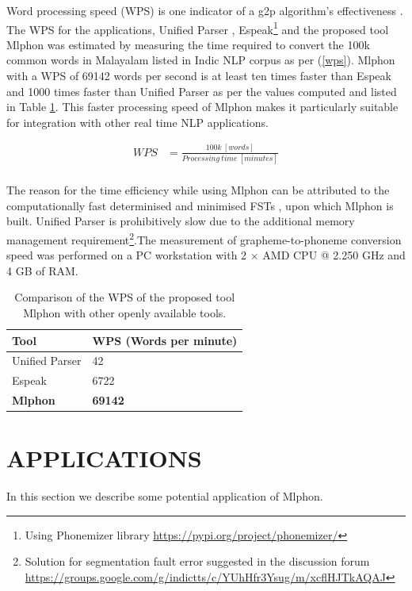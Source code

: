 \documentclass{ieeeaccess}
\begin{document}
Word processing speed (WPS) is one indicator of a g2p algorithm's effectiveness \cite{mdpi2022ruleg2p}. The WPS  for the applications, Unified Parser \cite{baby2016unified}, Espeak\footnote{Using Phonemizer library \url{https://pypi.org/project/phonemizer/}} and the proposed tool Mlphon was estimated by measuring the time required to convert the 100k common words in Malayalam listed in Indic NLP corpus \cite{kunchukuttan2020ai4bharat} as per (\ref{wps}). Mlphon with a WPS of 69142 words per second is at least ten times faster than Espeak and 1000 times faster than Unified Parser as per the values computed and listed in Table \ref{speed}. This faster processing speed of  Mlphon makes it particularly suitable for integration with other real time NLP applications.

\begin{equation}
\label{wps}
\begin{split}
WPS & =\frac{100k\ [words]}{Processing\ time\ [minutes]}  \\ 
\end{split}
\end{equation}

 The reason for the time efficiency while using Mlphon can be attributed to the computationally fast determinised and minimised FSTs \cite{mohri-1997-finite}, upon which Mlphon is built. 
Unified Parser is prohibitively slow due to the additional memory management requirement\footnote{Solution for segmentation fault error suggested in the discussion forum \url{https://groups.google.com/g/indictts/c/YUhHfr3Ysug/m/xcflHJTkAQAJ}}.The measurement of grapheme-to-phoneme conversion speed was performed on a PC workstation with 2 $\times$ AMD CPU @ 2.250 GHz and 4 GB of RAM. %




\begin{table}[h]
\caption{Comparison of the WPS of the proposed tool Mlphon with other openly available tools.}
\label{speed}
\begin{tabular}{l|l}
\hline \hline
    Tool &  WPS (Words per minute)\\ \hline
    Unified Parser & 42\\
    Espeak & 6722 \\
    \textbf{Mlphon} &  \textbf{69142} \\
    \hline
\end{tabular}
\end{table}


\section{APPLICATIONS}
\label{applications}
In this section we describe some potential application of Mlphon.
\end{document}

